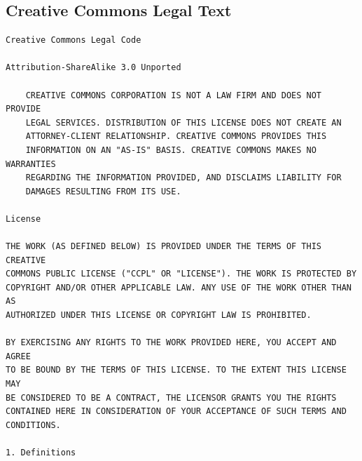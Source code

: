 \documentclass[10pt]{book}              %
\begin{document}
\begin{appendices}
	\chapter{Creative Commons Legal Text}
	\begin{verbatim}
Creative Commons Legal Code

Attribution-ShareAlike 3.0 Unported

    CREATIVE COMMONS CORPORATION IS NOT A LAW FIRM AND DOES NOT PROVIDE
    LEGAL SERVICES. DISTRIBUTION OF THIS LICENSE DOES NOT CREATE AN
    ATTORNEY-CLIENT RELATIONSHIP. CREATIVE COMMONS PROVIDES THIS
    INFORMATION ON AN "AS-IS" BASIS. CREATIVE COMMONS MAKES NO WARRANTIES
    REGARDING THE INFORMATION PROVIDED, AND DISCLAIMS LIABILITY FOR
    DAMAGES RESULTING FROM ITS USE.

License

THE WORK (AS DEFINED BELOW) IS PROVIDED UNDER THE TERMS OF THIS CREATIVE
COMMONS PUBLIC LICENSE ("CCPL" OR "LICENSE"). THE WORK IS PROTECTED BY
COPYRIGHT AND/OR OTHER APPLICABLE LAW. ANY USE OF THE WORK OTHER THAN AS
AUTHORIZED UNDER THIS LICENSE OR COPYRIGHT LAW IS PROHIBITED.

BY EXERCISING ANY RIGHTS TO THE WORK PROVIDED HERE, YOU ACCEPT AND AGREE
TO BE BOUND BY THE TERMS OF THIS LICENSE. TO THE EXTENT THIS LICENSE MAY
BE CONSIDERED TO BE A CONTRACT, THE LICENSOR GRANTS YOU THE RIGHTS
CONTAINED HERE IN CONSIDERATION OF YOUR ACCEPTANCE OF SUCH TERMS AND
CONDITIONS.

1. Definitions


\end{verbatim}
\end{appendices}
\end{document}
